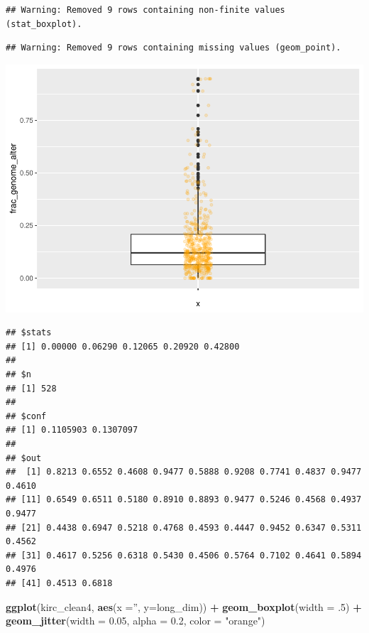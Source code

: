 \documentclass[]{article}
\newenvironment{Shaded}{\begin{snugshade}}{\end{snugshade}}
\newcommand{\KeywordTok}[1]{\textcolor[rgb]{0.13,0.29,0.53}{\textbf{#1}}}
\newcommand{\DataTypeTok}[1]{\textcolor[rgb]{0.13,0.29,0.53}{#1}}
\newcommand{\DecValTok}[1]{\textcolor[rgb]{0.00,0.00,0.81}{#1}}
\newcommand{\FloatTok}[1]{\textcolor[rgb]{0.00,0.00,0.81}{#1}}
\newcommand{\StringTok}[1]{\textcolor[rgb]{0.31,0.60,0.02}{#1}}
\newcommand{\OperatorTok}[1]{\textcolor[rgb]{0.81,0.36,0.00}{\textbf{#1}}}
\newcommand{\NormalTok}[1]{#1}
\begin{document}
\begin{verbatim}
## Warning: Removed 9 rows containing non-finite values (stat_boxplot).
\end{verbatim}

\begin{verbatim}
## Warning: Removed 9 rows containing missing values (geom_point).
\end{verbatim}

\includegraphics{figs/render-unnamed-chunk-18-1.pdf}

\begin{Shaded}
\end{Shaded}

\begin{verbatim}
## $stats
## [1] 0.00000 0.06290 0.12065 0.20920 0.42800
## 
## $n
## [1] 528
## 
## $conf
## [1] 0.1105903 0.1307097
## 
## $out
##  [1] 0.8213 0.6552 0.4608 0.9477 0.5888 0.9208 0.7741 0.4837 0.9477 0.4610
## [11] 0.6549 0.6511 0.5180 0.8910 0.8893 0.9477 0.5246 0.4568 0.4937 0.9477
## [21] 0.4438 0.6947 0.5218 0.4768 0.4593 0.4447 0.9452 0.6347 0.5311 0.4562
## [31] 0.4617 0.5256 0.6318 0.5430 0.4506 0.5764 0.7102 0.4641 0.5894 0.4976
## [41] 0.4513 0.6818
\end{verbatim}

\begin{Shaded}
\begin{Highlighting}[]
\KeywordTok{ggplot}\NormalTok{(kirc_clean4, }\KeywordTok{aes}\NormalTok{(}\DataTypeTok{x =}\StringTok{''}\NormalTok{, }\DataTypeTok{y=}\NormalTok{long_dim)) }\OperatorTok{+}
\StringTok{     }\KeywordTok{geom_boxplot}\NormalTok{(}\DataTypeTok{width =}\NormalTok{ .}\DecValTok{5}\NormalTok{) }\OperatorTok{+}
\StringTok{     }\KeywordTok{geom_jitter}\NormalTok{(}\DataTypeTok{width =} \FloatTok{0.05}\NormalTok{, }\DataTypeTok{alpha =} \FloatTok{0.2}\NormalTok{, }\DataTypeTok{color =} \StringTok{"orange"}\NormalTok{)}
\end{Highlighting}
\end{Shaded}
\end{document}
